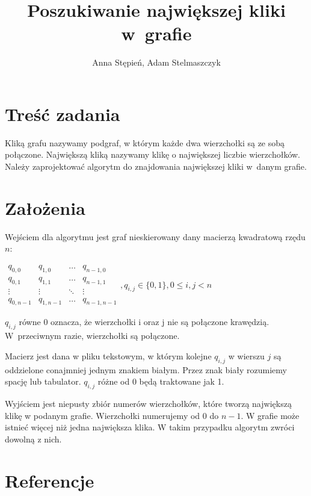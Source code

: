 \documentclass[12pt, a4paper]{article}
\title{\textbf{Poszukiwanie największej kliki w~grafie}}
\author{Anna Stępień, Adam Stelmaszczyk}
\date{}
\begin{document}
\maketitle
\setlength{\parindent}{0in}
\section{Treść zadania}

Kliką grafu nazywamy podgraf, w którym każde dwa wierzchołki są ze sobą połączone.
Największą kliką nazywamy klikę o największej liczbie wierzchołków.
Należy zaprojektować algorytm do znajdowania największej kliki w~danym grafie.

\section{Założenia}

Wejściem dla algorytmu jest graf nieskierowany dany macierzą kwadratową rzędu $n$:

\bigskip
$ 
\begin{array}{cccc}
q_{0,0} & q_{1,0} & \ldots & q_{n-1,0} \\
q_{0,1} & q_{1,1} & \ldots & q_{n-1,1} \\
\vdots  & \vdots  & \ddots & \vdots  \\
q_{0,n-1} & q_{1,n-1} & \ldots & q_{n-1,n-1} 
\end{array}
, q_{i,j} \in \{0,1\}, 0 \leq i,j < n
$
\bigskip

$q_{i,j}$ równe 0 oznacza, że wierzchołki i oraz j nie są połączone krawędzią. W~przeciwnym razie, wierzchołki są połączone.
\par\vspace{\baselineskip}
Macierz jest dana w pliku tekstowym, w którym kolejne $q_{i,j}$ w wierszu $j$ są oddzielone conajmniej jednym znakiem białym. 
Przez znak biały rozumiemy spację lub tabulator. $q_{i,j}$ różne od 0 będą traktowane jak 1.
\par\vspace{\baselineskip}
Wyjściem jest niepusty zbiór numerów wierzchołków, które tworzą największą klikę w podanym grafie. 
Wierzchołki numerujemy od 0 do $n-1$. W grafie może istnieć więcej niż jedna największa klika.
W takim przypadku algorytm zwróci dowolną z nich.

\section{Referencje}
\end{document}
